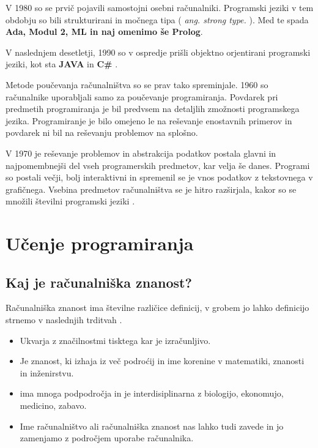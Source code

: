 V 1980 so se prvič pojavili samostojni osebni računalniki. Programski
jeziki v tem obdobju so bili strukturirani in močnega tipa (
\emph{ang.  strong type.} ). Med te spada \textbf{Ada, Modul 2, ML in
  naj omenimo še Prolog}.

V naslednjem desetletji, 1990 so v ospredje
prišli objektno orjentirani programski jeziki, kot sta \textbf{JAVA}
in \textbf{C\#} \cite{thesisAWebP}.



Metode poučevanja računalništva so se prav tako spreminjale. 1960 so
računalnike uporabljali samo za poučevanje programiranja. Povdarek pri
predmetih programiranja je bil predvsem na detaljlih zmožnosti
programskega jezika. Programiranje je bilo omejeno le na reševanje
enostavnih primerov in povdarek ni bil na reševanju problemov na
splošno.

V 1970 je reševanje problemov in abstrakcija podatkov postala glavni
in najpomembnejši del vseh programerskih predmetov, kar velja še
danes.  Programi so postali večji, bolj interaktivni in spremenil se
je vnos podatkov z tekstovnega v grafičnega. Vsebina predmetov
računalništva se je hitro razširjala, kakor so se množili številni
programski jeziki \cite{thesisAWebP}.




\section{Učenje programiranja}
\label{sec:učenje_programiranja}


\subsection{Kaj je računalniška znanost?}
\label{sec:kaj_je_računalniška_znanost}

Računalniška znanost ima številne različice definicij, v grobem jo
lahko definicijo strnemo v naslednjih trditvah \cite{guideTCS}.

\begin{itemize}
\item Ukvarja z značilnostmi tisktega kar je izračunljivo.
\item Je znanost, ki izhaja iz več podroćij in ime korenine v matematiki,
znanosti in inženirstvu.
\item ima mnoga podpodročja in je interdisiplinarna z biologijo,
ekonomujo, medicino, zabavo.
\item Ime računalništvo ali računalniška znanost nas lahko tudi zavede in
jo zamenjamo z področjem uporabe računalnika.
\end{itemize}

